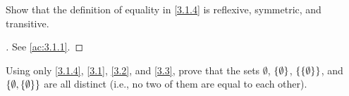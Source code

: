 \exercisesection

\begin{ex}\label{ex:3.1.1}
  Show that the definition of equality in \cref{3.1.4} is reflexive, symmetric, and transitive.
\end{ex}

\begin{proof}[]
  See \cref{ac:3.1.1}.
\end{proof}

\begin{ex}\label{ex:3.1.2}
  Using only \cref{3.1.4}, \cref{3.1}, \cref{3.2}, and \cref{3.3}, prove that the sets \(\emptyset\), \(\left\lbrace\emptyset\right\rbrace\), \(\left\lbrace\left\lbrace\emptyset\right\rbrace\right\rbrace\), and \(\left\lbrace\emptyset, \left\lbrace\emptyset\right\rbrace\right\rbrace\) are all distinct
  (i.e., no two of them are equal to each other).
\end{ex}

